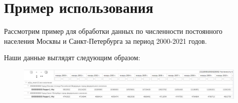 \section{Пример использования}

Рассмотрим пример для обработки данных по численности постоянного населения Москвы и Санкт-Петербурга за период 2000-2021 годов.

Наши данные выглядят следующим образом:

\begin{figure}[H]
	\begin{center}
		\includegraphics[scale = 0.47]{include/fig/data_rosstat}
	\end{center}
\end{figure}

